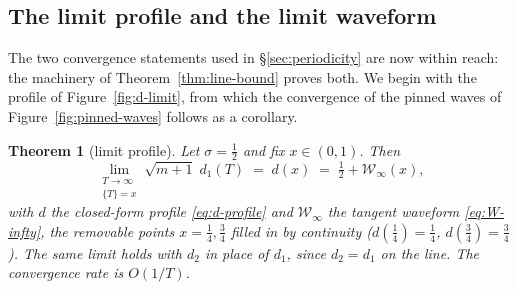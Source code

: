 \documentclass[11pt]{article}
\newtheorem{theorem}{Theorem}[section]
\theoremstyle{definition}
\begin{document}
\subsection{The limit profile and the limit waveform}\label{sec:limits}

The two convergence statements used in \S\ref{sec:periodicity} are now
within reach: the machinery of Theorem~\ref{thm:line-bound} proves both. We
begin with the profile of Figure~\ref{fig:d-limit}, from which the
convergence of the pinned waves of Figure~\ref{fig:pinned-waves} follows
as a corollary.

\begin{theorem}[limit profile]\label{thm:d1-limit}
Let $\sigma=\tfrac12$ and fix $x\in(0,1)$. Then
\[
\lim_{\substack{T\to\infty\\ \{T\}=x}}\sqrt{m+1}\;d_1(T)
\;=\;d(x)\;=\;\tfrac12+\mathcal W_{\infty}(x),
\]
with $d$ the closed-form profile \eqref{eq:d-profile} and
$\mathcal W_{\infty}$ the tangent waveform \eqref{eq:W-infty}, the
removable points $x=\tfrac14,\tfrac34$ filled in by continuity
($d(\tfrac14)=\tfrac14$, $d(\tfrac34)=\tfrac34$). The same limit holds
with $d_2$ in place of $d_1$, since $d_2=d_1$ on the line. The
convergence rate is $O(1/T)$.
\end{theorem}
\end{document}
